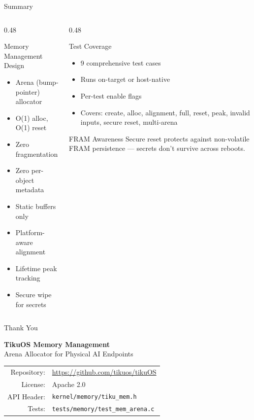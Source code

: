 \documentclass[aspectratio=169, 10pt]{beamer}
\begin{document}
\begin{frame}{Summary}
\begin{columns}[T]
\begin{column}{0.48\textwidth}
\begin{block}{Memory Management Design}
\begin{itemize}
  \item Arena (bump-pointer) allocator
  \item O(1) alloc, O(1) reset
  \item Zero fragmentation
  \item Zero per-object metadata
  \item Static buffers only
  \item Platform-aware alignment
  \item Lifetime peak tracking
  \item Secure wipe for secrets
\end{itemize}
\end{block}
\end{column}

\begin{column}{0.48\textwidth}
\begin{block}{Test Coverage}
\begin{itemize}
  \item 9 comprehensive test cases
  \item Runs on-target or host-native
  \item Per-test enable flags
  \item Covers: create, alloc, alignment, full, reset, peak, invalid inputs, secure reset, multi-arena
\end{itemize}
\end{block}

\vspace{0.3em}
\begin{alertblock}{FRAM Awareness}
Secure reset protects against non-volatile FRAM persistence ---
secrets don't survive across reboots.
\end{alertblock}
\end{column}
\end{columns}
\end{frame}

\begin{frame}{Thank You}
\begin{center}
\Large\textbf{TikuOS Memory Management}\\[0.5em]
\normalsize Arena Allocator for Physical AI Endpoints\\[1.5em]

\begin{tabular}{rl}
  Repository: & \url{https://github.com/tikuos/tikuOS} \\
  License:    & Apache 2.0 \\
  API Header: & \texttt{kernel/memory/tiku\_mem.h} \\
  Tests:      & \texttt{tests/memory/test\_mem\_arena.c} \\
\end{tabular}
\end{center}
\end{frame}
\end{document}
